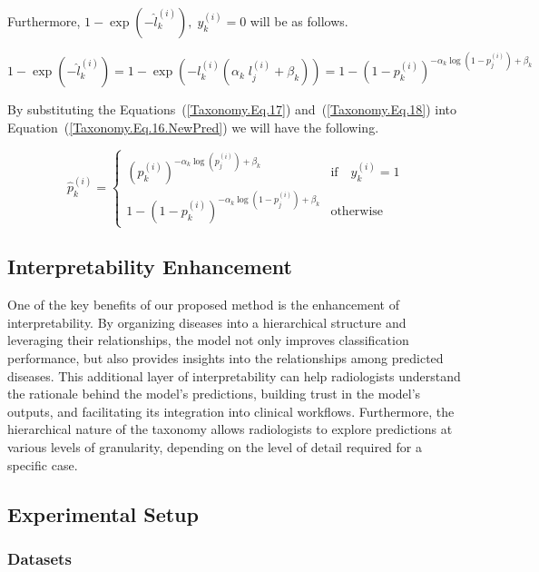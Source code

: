 Furthermore, $1-\exp{\left(-{\widehat l}_k^{(i)}\right)},\;y_k^{(i)}=0 $ will be as follows.

\begin{equation}
    \label{Taxonomy.Eq.18}
    1-\exp{\left(-{\widehat l}_k^{(i)}\right)}=1-\exp{\left(-l_k^{(i)}\left(\alpha_k\;l_j^{(i)}+\beta_k\right)\right)}={1-\left(1-p_k^{(i)}\right)}^{-\alpha_k{\log{\left(1-p_j^{(i)}\right)}}+\beta_k}
\end{equation}


By substituting the Equations~(\ref{Taxonomy.Eq.17}) and~(\ref{Taxonomy.Eq.18})  into Equation~(\ref{Taxonomy.Eq.16.NewPred})  we will have the following.


\begin{equation}
    \label{Taxonomy.Eq.19.NewPred}
    \widehat{p}_k^{(i)} =
    \begin{cases}
        {\left( p_k^{(i)} \right)}^{-\alpha_k \log(p_j^{(i)}) + \beta_k} & \text{if} \quad y_k^{(i)} = 1 \\
        1 - {\left( 1 - p_k^{(i)} \right)}^{-\alpha_k \log{\left( 1 - p_j^{(i)} \right)} + \beta_k} & \text{otherwise}
    \end{cases}
\end{equation}


\subsection{Interpretability Enhancement}

One of the key benefits of our proposed method is the enhancement of interpretability. By organizing diseases into a hierarchical structure and leveraging their relationships, the model not only improves classification performance, but also provides insights into the relationships among predicted diseases. This additional layer of interpretability can help radiologists understand the rationale behind the model's predictions, building trust in the model's outputs, and facilitating its integration into clinical workflows. Furthermore, the hierarchical nature of the taxonomy allows radiologists to explore predictions at various levels of granularity, depending on the level of detail required for a specific case.



\subsection{Experimental Setup}


\subsubsection{Datasets}


